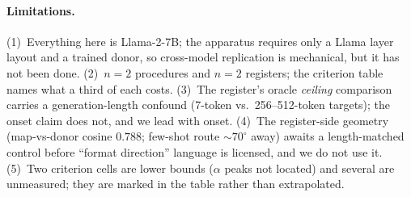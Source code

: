 \documentclass{article}
\begin{document}
\paragraph{Limitations.} (1)~Everything here is Llama-2-7B; the apparatus requires only a Llama
layer layout and a trained donor, so cross-model replication is mechanical, but it has not been
done. (2)~$n{=}2$ procedures and $n{=}2$ registers; the criterion table names what a third of each
costs. (3)~The register's oracle \emph{ceiling} comparison carries a generation-length confound
(7-token vs.\ 256--512-token targets); the onset claim does not, and we lead with onset.
(4)~The register-side geometry (map-vs-donor cosine $0.788$; few-shot route ${\sim}70^{\circ}$
away) awaits a length-matched control before ``format direction'' language is licensed, and we do
not use it. (5)~Two criterion cells are lower bounds ($\alpha$ peaks not located) and several are
unmeasured; they are marked in the table rather than extrapolated.



\end{document}
